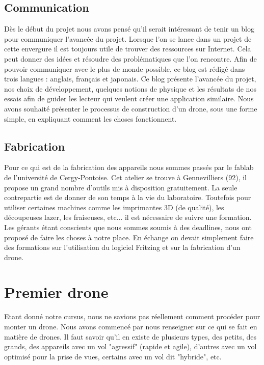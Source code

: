\documentclass[a4paper,10pt]{report}
\begin{document}
    \section{Communication}
      Dès le début du projet nous avons pensé qu'il serait intéressant de tenir un blog\cite{njordblog} pour communiquer l'avancée
      du projet. Lorsque l'on se lance dans un projet de cette envergure il est toujours utile de trouver des ressources sur Internet.
      Cela peut donner des idées et résoudre des problématiques que l'on rencontre. Afin de pouvoir communiquer avec le plus de monde 
      possible, ce blog est rédigé dans trois langues : anglais, français et japonais. Ce blog présente l'avancée du projet, nos choix
      de développement, quelques notions de physique et les résultats de nos essais afin de guider les lecteur qui veulent créer une 
      application similaire. Nous avons souhaité présenter le processus de construction d'un drone, sous une forme simple, en expliquant
      comment les choses fonctionnent.
      
    \section{Fabrication}
      Pour ce qui est de la fabrication des appareils nous sommes passés par le fablab\cite{faclab} de l'université de Cergy-Pontoise. 
      Cet atelier se trouve à Gennevilliers (92), il propose un grand nombre d'outils mis à disposition gratuitement. La seule 
      contrepartie est de donner de son temps à la vie du laboratoire. Toutefois pour utiliser certaines machines comme les imprimantes
      3D (de qualité), les découpeuses lazer, les fraiseuses, etc... il est nécessaire de suivre une formation. Les gérants étant 
      conscients que nous sommes soumis à des deadlines, nous ont proposé de faire les choses à notre place. En échange on devait 
      simplement faire des formations sur l'utilisation du logiciel Fritzing et sur la fabrication d'un drone.

  \chapter{Premier drone}
    Etant donné notre cursus, nous ne savions pas réellement comment procéder pour monter un drone. Nous avons commencé par nous
    renseigner sur ce qui se fait en matière de drones. Il faut savoir qu'il en existe de plusieurs types, des petits, des grands,
    des appareils avec un vol "agressif" (rapide et agile), d'autres avec un vol optimisé pour la prise de vues, certains avec un 
    vol dit "hybride", etc.
    
\end{document}
